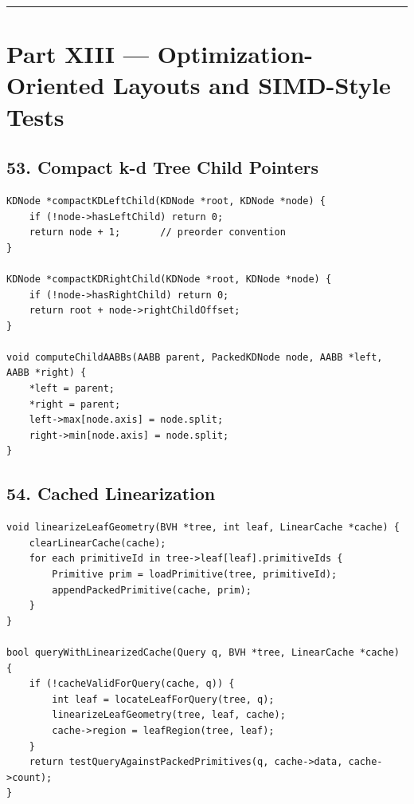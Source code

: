 \documentclass[10pt,letterpaper]{article}
\begin{document}
\medskip\hrule\medskip


\clearpage
{}
\section*{Part XIII --- Optimization-Oriented Layouts and SIMD-Style Tests}


\subsection*{53. Compact k-d Tree Child Pointers}

\begin{verbatim}
KDNode *compactKDLeftChild(KDNode *root, KDNode *node) {
    if (!node->hasLeftChild) return 0;
    return node + 1;       // preorder convention
}

KDNode *compactKDRightChild(KDNode *root, KDNode *node) {
    if (!node->hasRightChild) return 0;
    return root + node->rightChildOffset;
}

void computeChildAABBs(AABB parent, PackedKDNode node, AABB *left, AABB *right) {
    *left = parent;
    *right = parent;
    left->max[node.axis] = node.split;
    right->min[node.axis] = node.split;
}
\end{verbatim}


\subsection*{54. Cached Linearization}

\begin{verbatim}
void linearizeLeafGeometry(BVH *tree, int leaf, LinearCache *cache) {
    clearLinearCache(cache);
    for each primitiveId in tree->leaf[leaf].primitiveIds {
        Primitive prim = loadPrimitive(tree, primitiveId);
        appendPackedPrimitive(cache, prim);
    }
}

bool queryWithLinearizedCache(Query q, BVH *tree, LinearCache *cache) {
    if (!cacheValidForQuery(cache, q)) {
        int leaf = locateLeafForQuery(tree, q);
        linearizeLeafGeometry(tree, leaf, cache);
        cache->region = leafRegion(tree, leaf);
    }
    return testQueryAgainstPackedPrimitives(q, cache->data, cache->count);
}
\end{verbatim}
\end{document}
